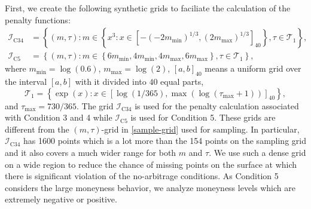 \documentclass[11pt,a4paper]{article}
\theoremstyle{remark}
\begin{document}
First, we create the following synthetic grids to faciliate the calculation of the penalty functions:
\begin{align}
\mathcal{I}_{\mathrm{C} 34}&=\left\{(m, \tau): m \in\left\{x^{3}: x \in\left[-\left(-2 m_{\min }\right)^{1 / 3},\left(2 m_{\max }\right)^{1 / 3}\right]_{40}\right\}, \tau \in \mathcal{T}_1\right\},\\
\mathcal{I}_{\mathrm{C} 5}&=\left\{(m, \tau): m \in\left\{6 m_{\min }, 4 m_{\min }, 4 m_{\max }, 6 m_{\max }\right\}, \tau \in \mathcal{T}_1\right\},
\end{align}
where $m_{\min}=\log(0.6)$, $m_{\max}=\log(2)$, $[a,b]_{40}$ means a uniform grid over the interval $[a,b]$ with it divided into $40$ equal parts, 
\begin{equation}
	\mathcal{T}_1=\left\{\exp (x): x \in\left[\log (1 / 365), \max \left(\log \left(\tau_{\max}+1\right)\right)\right]_{40}\right\},
\end{equation}
and $\tau_{\max}=730/365$. The grid $\mathcal{I}_{\mathrm{C} 34}$ is used for the penalty calculation associated with Condition 3 and 4 while $\mathcal{I}_{\mathrm{C} 5}$ is used for Condition 5. These grids are different from the $(m,\tau)$-grid in \eqref{sample-grid} used for sampling. In particular, $\mathcal{I}_{\mathrm{C} 34}$ has 1600 points which is a lot more than the 154 points on the sampling grid and it also covers a much wider range for both $m$ and $\tau$. We use such a dense grid on a wide region to reduce the chance of missing points on the surface at which there is significant violation of the no-arbitrage conditions. As Condition 5 considers the large moneyness behavior, we analyze moneyness levels which are extremely negative or positive.   
\end{document}
